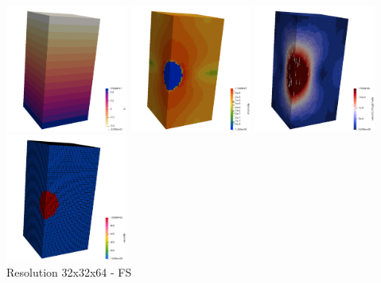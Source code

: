 \begin{center}
\includegraphics[width=4cm]{python_codes/fieldstone_10/results/quarter_FS/press}
\includegraphics[width=4cm]{python_codes/fieldstone_10/results/quarter_FS/sr}
\includegraphics[width=4cm]{python_codes/fieldstone_10/results/quarter_FS/vel}
\includegraphics[width=4cm]{python_codes/fieldstone_10/results/quarter_FS/eta}\\
{\captionfont Resolution 32x32x64 - FS}
\end{center}




